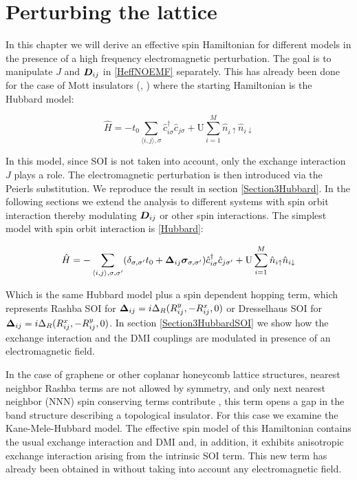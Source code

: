 \chapter{Perturbing the lattice}

In this chapter we will derive an effective spin Hamiltonian for different models in the presence of a high frequency electromagnetic perturbation. The goal is to manipulate $J$ and $\boldsymbol{D}_{ij}$ in \ref{HeffNOEMF} separately. This has already been done for the case of Mott insulators (\cite{Mentink2015}, \cite{Kitamura2017}) where the starting Hamiltonian is the Hubbard model:

\begin{equation*}
\hat{H} = -t_0\sum_{\langle i,j \rangle, \sigma} \hat{c}_{i \sigma}^\dagger \hat{c}_{j \sigma} + \text{U} \sum_{i=1}^M \hat{n}_{i\uparrow}\hat{n}_{i\downarrow}
\end{equation*} 

In this model, since SOI is not taken into account, only the exchange interaction $J$ plays a role. The electromagnetic perturbation is then introduced via the Peierls substitution. We reproduce the result in section \ref{Section3Hubbard}. In the following sections we extend the analysis to different systems with spin orbit interaction thereby modulating $\boldsymbol{D}_{ij}$ or other spin interactions. The simplest model with spin orbit interaction is \ref{Hubbard}:

\begin{equation*}
\hat{H} = -\sum_{\langle i,j \rangle, \sigma, \sigma'}(\delta_{\sigma, \sigma'} t_{0} + \boldsymbol{\Delta}_{ij} \boldsymbol{\sigma}_{\sigma, \sigma'})\hat{c}_{i \sigma}^\dagger \hat{c}_{j \sigma'} + \text{U} \sum_{i=1}^M \hat{n}_{i\uparrow}\hat{n}_{i\downarrow}
\end{equation*}

Which is the same Hubbard model plus a spin dependent hopping term, which represents Rashba SOI for $\boldsymbol{\Delta}_{ij} = i\Delta_R(R_{ij}^y, -R_{ij}^x, 0)$ or Dresselhaus SOI for $\boldsymbol{\Delta}_{ij} = i\Delta_R(R_{ij}^x, -R_{ij}^y, 0)$. In section \ref{Section3HubbardSOI} we show how the exchange interaction and the DMI couplings are modulated in presence of an electromagnetic field.  

In the case of graphene or other coplanar honeycomb lattice structures, nearest neighbor Rashba terms are not allowed by symmetry, and only next nearest neighbor (NNN) spin conserving terms contribute \cite{Kane2005}, this term opens a gap in the band structure describing a topological insulator. For this case we examine the Kane-Mele-Hubbard model. The effective spin model of this Hamiltonian contains the usual exchange interaction and DMI and, in addition, it exhibits anisotropic exchange interaction arising from the intrinsic SOI term. This new term has already been obtained in \cite{Rachel2010} without taking into account any electromagnetic field.

